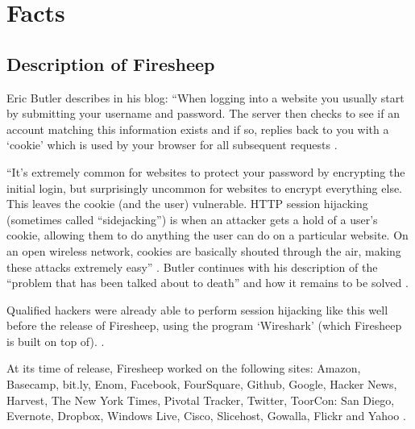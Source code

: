 \documentclass[12pt]{article}
\begin{document}
\section{Facts}

\subsection{Description of Firesheep}
Eric Butler describes in his blog: ``When logging into a website you usually start by submitting your username and password. The server then checks to see if an account matching this information exists and if so, replies back to you with a `cookie' which is used by your browser for all subsequent requests \cite{eric-butler}.

``It's extremely common for websites to protect your password by encrypting the initial login, but surprisingly uncommon for websites to encrypt everything else. This leaves the cookie (and the user) vulnerable. HTTP session hijacking (sometimes called ``sidejacking'') is when an attacker gets a hold of a user's cookie, allowing them to do anything the user can do on a particular website. On an open wireless network, cookies are basically shouted through the air, making these attacks extremely easy'' \cite{eric-butler}. Butler continues with his description of the ``problem that has been talked about to death'' and how it remains to be solved \cite{eric-butler}. 

Qualified hackers were already able to perform session hijacking like this well before the release of Firesheep, using the program `Wireshark' (which Firesheep is built on top of). \cite{wireshark}.

At its time of release, Firesheep worked on the following sites: Amazon, Basecamp, bit.ly, Enom, Facebook, FourSquare, Github, Google, Hacker News, Harvest, The New York Times, Pivotal Tracker, Twitter, ToorCon: San Diego, Evernote, Dropbox, Windows Live, Cisco, Slicehost, Gowalla, Flickr and Yahoo \cite{firesheep-source}.
\end{document}
